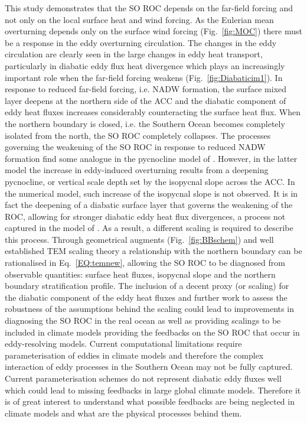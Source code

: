 This study demonstrates that the SO ROC depends on the far-field forcing and not only on the local surface heat and wind forcing. 
As the Eulerian mean overturning depends only on the surface wind forcing (Fig.~\ref{fig:MOC}) there must be a response in the eddy overturning circulation. 
The changes in the eddy circulation are clearly seen in the large changes in eddy heat transport, particularly in diabatic eddy flux heat divergence which plays an increasingly important role when the far-field forcing weakens (Fig.~\ref{fig:Diabaticim1}). 
In response to reduced far-field forcing, i.e. NADW formation, the surface mixed layer deepens at the northern side of the ACC and the diabatic component of eddy heat fluxes increases considerably counteracting the surface heat flux. 
When the northern boundary is closed, i.e. the Southern Ocean becomes completely isolated from the north, the SO ROC completely collapses. 
The processes governing the weakening of the SO ROC in response to reduced NADW formation find some analogue in the pycnocline model of \cite{g99}. However, in the latter model the increase in eddy-induced overturning results from a deepening pycnocline, or vertical scale depth set by the isopycnal slope across the ACC. In the numerical model, such increase of the isopycnal slope is not observed. It is in fact the deepening of a diabatic surface layer that governs the weakening of the ROC, allowing for stronger diabatic eddy heat flux divergences, a process not captured in the model of \cite{g99}.  
As a result, a different scaling is required to describe this process.
Through geometrical augments (Fig.~\ref{fig:BBschem}) and well established TEM scaling theory a relationship with the northern boundary can be rationalised in Eq.~\ref{EQ:temnew},
allowing the SO ROC to be diagnosed from observable quantities: surface heat fluxes, isopycnal slope and the northern boundary stratification profile.  
The inclusion of a decent proxy (or scaling) for the diabatic component of the eddy heat fluxes and further work to assess the robustness of the assumptions behind the scaling could lead to improvements in diagnosing the SO ROC in the real ocean as well as providing scalings to be included in climate models providing the feedbacks on the SO ROC that occur in eddy-resolving models.
Current computational limitations require parameterisation of eddies in climate models and therefore the complex interaction of eddy processes in the Southern Ocean may not be fully captured. Current parameterisation schemes do not represent diabatic eddy fluxes well \cite{griffies2000} \cite{Mcwilliams2008} which could lead to missing feedbacks in large global climate models. Therefore it is of great interest to understand what possible feedbacks are being neglected in climate models and what are the physical processes behind them. 

